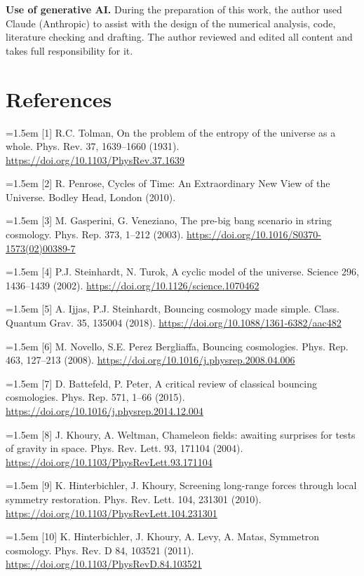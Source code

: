 \documentclass[11pt,a4paper]{article}
\begin{document}
\noindent\textbf{Use of generative AI.} During the preparation of this work, the author used Claude (Anthropic) to assist with the design of the numerical analysis, code, literature checking and drafting. The author reviewed and edited all content and takes full responsibility for it.

\section*{References}
\noindent\hangindent=1.5em [1] R.C. Tolman, On the problem of the entropy of the universe as a whole. Phys. Rev. 37, 1639--1660 (1931). \url{https://doi.org/10.1103/PhysRev.37.1639}\par
\noindent\hangindent=1.5em [2] R. Penrose, Cycles of Time: An Extraordinary New View of the Universe. Bodley Head, London (2010).\par
\noindent\hangindent=1.5em [3] M. Gasperini, G. Veneziano, The pre-big bang scenario in string cosmology. Phys. Rep. 373, 1--212 (2003). \url{https://doi.org/10.1016/S0370-1573(02)00389-7}\par
\noindent\hangindent=1.5em [4] P.J. Steinhardt, N. Turok, A cyclic model of the universe. Science 296, 1436--1439 (2002). \url{https://doi.org/10.1126/science.1070462}\par
\noindent\hangindent=1.5em [5] A. Ijjas, P.J. Steinhardt, Bouncing cosmology made simple. Class. Quantum Grav. 35, 135004 (2018). \url{https://doi.org/10.1088/1361-6382/aac482}\par
\noindent\hangindent=1.5em [6] M. Novello, S.E. Perez Bergliaffa, Bouncing cosmologies. Phys. Rep. 463, 127--213 (2008). \url{https://doi.org/10.1016/j.physrep.2008.04.006}\par
\noindent\hangindent=1.5em [7] D. Battefeld, P. Peter, A critical review of classical bouncing cosmologies. Phys. Rep. 571, 1--66 (2015). \url{https://doi.org/10.1016/j.physrep.2014.12.004}\par
\noindent\hangindent=1.5em [8] J. Khoury, A. Weltman, Chameleon fields: awaiting surprises for tests of gravity in space. Phys. Rev. Lett. 93, 171104 (2004). \url{https://doi.org/10.1103/PhysRevLett.93.171104}\par
\noindent\hangindent=1.5em [9] K. Hinterbichler, J. Khoury, Screening long-range forces through local symmetry restoration. Phys. Rev. Lett. 104, 231301 (2010). \url{https://doi.org/10.1103/PhysRevLett.104.231301}\par
\noindent\hangindent=1.5em [10] K. Hinterbichler, J. Khoury, A. Levy, A. Matas, Symmetron cosmology. Phys. Rev. D 84, 103521 (2011). \url{https://doi.org/10.1103/PhysRevD.84.103521}\par
\end{document}
